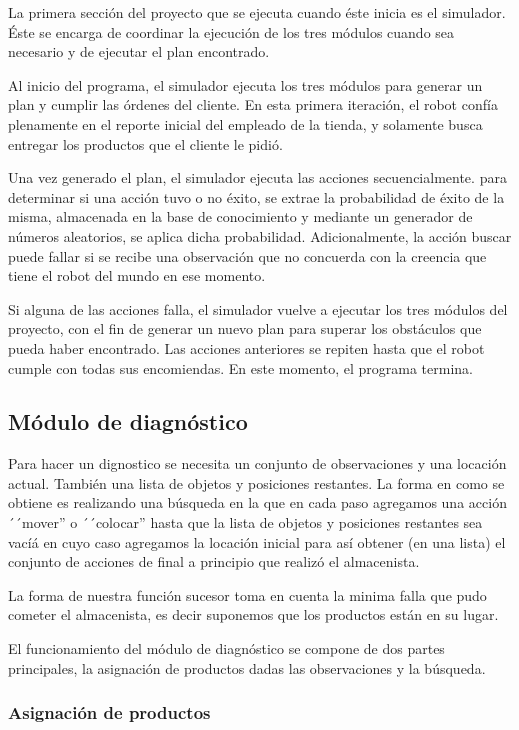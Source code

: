 \documentclass[11pt]{article}
\begin{document}
La primera sección del proyecto que se ejecuta cuando éste inicia es el simulador. Éste se encarga de coordinar la ejecución de los tres módulos cuando sea necesario y de ejecutar el plan encontrado.

Al inicio del programa, el simulador ejecuta los tres módulos para generar un plan y cumplir las órdenes del cliente. En esta primera iteración, el robot confía plenamente en el reporte inicial del empleado de la tienda, y solamente busca entregar los productos que el cliente le pidió.

Una vez generado el plan, el simulador ejecuta las acciones secuencialmente. para determinar si una acción tuvo o no éxito, se extrae la probabilidad de éxito de la misma, almacenada en la base de conocimiento y mediante un generador de números aleatorios, se aplica dicha probabilidad. Adicionalmente, la acción buscar puede fallar si se recibe una observación que no concuerda con la creencia que tiene el robot del mundo en ese momento.

Si alguna de las acciones falla, el simulador vuelve a ejecutar los tres módulos del proyecto, con el fin de generar un nuevo plan para superar los obstáculos que pueda haber encontrado. Las acciones anteriores se repiten hasta que el robot cumple con todas sus encomiendas. En este momento, el programa termina.

\subsection{Módulo de diagnóstico}

Para hacer un dignostico se necesita un conjunto de observaciones y una
locación actual. También una lista de objetos y posiciones restantes.
La forma en como se obtiene es realizando una búsqueda en la que en cada
paso agregamos una acción ´´mover'' o ´´colocar'' hasta que la lista de
objetos y posiciones restantes sea vacíá en cuyo caso agregamos la
locación inicial para así obtener (en una lista) el conjunto de acciones
de final a principio que realizó el almacenista.

La forma de nuestra función sucesor toma en cuenta la minima falla que pudo
cometer el almacenista, es decir suponemos que los productos están en su
lugar.

El funcionamiento del módulo de diagnóstico se compone de dos
partes principales, la asignación de productos dadas las
observaciones y la búsqueda.

\subsubsection{Asignación de productos}
\end{document}
